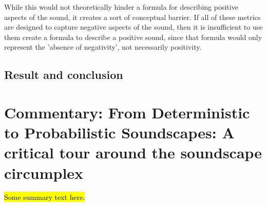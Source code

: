 \documentclass[twoside,fontsize=12pt,titlepage]{scrbook}
\begin{document}
             While this would not theoretically hinder a formula for describing positive aspects of the sound, it creates a sort of conceptual barrier. If all of these metrics are designed to capture negative aspects of the sound, then it is insufficient to use them create a formula to describe a positive sound, since that formula would only represent the 'absence of negativity', not necessarily positivity.
 \subsection*{Result and conclusion}

       

\section{Commentary: From Deterministic to Probabilistic Soundscapes: A critical tour around the soundscape circumplex}

 \hl{Some summary text here.}

 





 



 \backmatter

 

\end{document}

